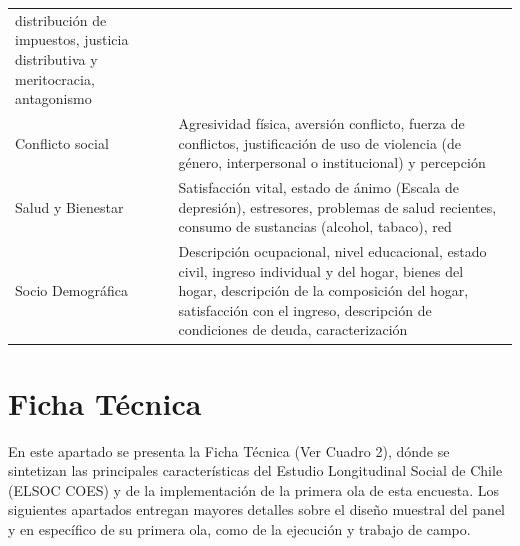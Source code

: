 \documentclass[
]{book}
\begin{document}
\begin{table}
\begin{tabular}[t]{>{\raggedright\arraybackslash}p{6cm}>{\raggedright\arraybackslash}p{14cm}}
          distribución de impuestos, justicia distributiva y meritocracia, antagonismo
\cellcolor{white}{          de clases sociales.}\\
Conflicto social & Agresividad física, aversión conflicto, fuerza de conflictos, justificación de
            uso de violencia (de género, interpersonal o institucional) y percepción
\cellcolor{white}{            violencia.}\\
\addlinespace
Salud y Bienestar & Satisfacción vital, estado de ánimo (Escala de depresión), estresores, problemas
          de salud recientes, consumo de sustancias (alcohol, tabaco), red
\cellcolor{white}{          de apoyo, interacción con el sistema de salud y peso/estatura.}\\
Socio Demográfica & Descripción ocupacional, nivel educacional, estado civil, ingreso individual
            y del hogar, bienes del hogar, descripción de la composición del hogar,
            satisfacción con el ingreso, descripción de condiciones de deuda, caracterización
\cellcolor{white}{            de la vivienda y adscripción y practicancia religiosa.}\\
\bottomrule
\end{tabular}
\end{table}

\hypertarget{ficha-tuxe9cnica}{%
\section{Ficha Técnica}\label{ficha-tuxe9cnica}}

En este apartado se presenta la Ficha Técnica (Ver Cuadro 2), dónde se sintetizan las principales características del Estudio Longitudinal Social de Chile (ELSOC COES) y de la implementación de la primera ola de esta encuesta. Los siguientes apartados entregan mayores detalles sobre el diseño muestral del panel y en específico de su primera ola, como de la ejecución y trabajo de campo.
\end{document}
